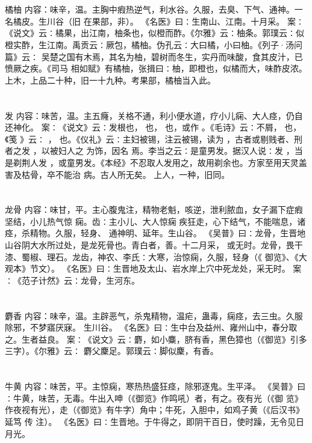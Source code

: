 \documentclass[12pt,UTF8]{ctexbook}
\begin{document}
\chapter{}橘柚
内容：味辛，温。主胸中瘕热逆气，利水谷。久服，去臭、下气、通神。一名橘皮。生川谷（旧 
在果部，非）。 
《名医》曰∶生南山、江南。十月采。 
案∶《说文》云∶橘果，出江南，柚条也，似橙而酢。《尔雅》云∶柚条。郭璞云∶似 
橙实酢，生江南。禹贡云∶厥包，橘柚。伪孔云∶大曰橘，小曰柚。《列子·汤问篇》云∶ 
吴楚之国有木焉，其名为柚，碧树而冬生，实丹而味酸，食其皮汁，已愤厥之疾。《司马 
相如赋》有橘柚，张揖曰∶柚，即橙也，似橘而大，味酢皮浓。 
上木，上品二十种，旧一十九种。考果部，橘柚当入此。 


\chapter{}发
内容：味苦，温。主五癃，关格不通，利小便水道，疗小儿痫、大人痉，仍自还神化。 
案∶《说文》云∶发根也， 也， 也，或作 。《毛诗》云∶不屑， 也，《笺 
》云∶ ， 也。《仪礼》云∶主妇被锡，注云被锡，读为 ，古者或剔贱者、刑者之发 
，以被妇人之 为饰，因名 焉。李当之云∶是童男发。据汉人说∶发 ，当是剃荆人发 
，或童男发。《本经》不忍取人发用之，故用剃余也。方家至用天灵盖害及枯骨，卒不能治 
病。古人所无矣。 
上人，一种，旧同。 


\chapter{}龙骨
内容：味甘，平。主心腹鬼注，精物老魁，咳逆，泄利脓血，女子漏下症瘕坚结，小儿热气惊 
痫。齿∶主小儿、大人惊痫 疾狂走，心下结气，不能喘息，诸痉，杀精物。久服，轻身、 
通神明、延年。生山谷。 
《吴普》曰∶龙骨，生晋地山谷阴大水所过处，是龙死骨也。青白者，善。十二月采， 
或无时。龙骨，畏干漆、蜀椒、理石。龙齿，神农、李氏∶大寒，治惊痫，久服，轻身（《 
御览》、《大观本》节文）。 
《名医》曰∶生晋地及太山、岩水岸上穴中死龙处，采无时。 
案∶《范子计然》云∶龙骨，生河东。 


\chapter{}麝香
内容：味辛，温。主辟恶气，杀鬼精物，温疟，蛊毒，痫痉，去三虫。久服除邪，不梦寤厌寐。 
生川谷。 
《名医》曰∶生中台及益州、雍州山中，春分取之。生者益良。 
案∶《说文》云∶麝，如小麋，脐有香，黑色獐也（《御览》引多三字）。《尔雅》云∶ 
麝父麇足。郭璞云∶脚似麇，有香。 


\chapter{}牛黄
内容：味苦，平。主惊痫，寒热热盛狂痉，除邪逐鬼。生平泽。 
《吴普》曰∶牛黄，味苦，无毒。牛出入呻（《御览》作鸣吼）者，有之。夜有光（《御 
览》作夜视有光），走（《御览》有牛字）角中；牛死，入胆中，如鸡子黄（《后汉书》延笃 
传 
注）。 
《名医》曰∶生晋地。于牛得之，即阴干百日，使时躁，无令见日月光。 
\end{document}
